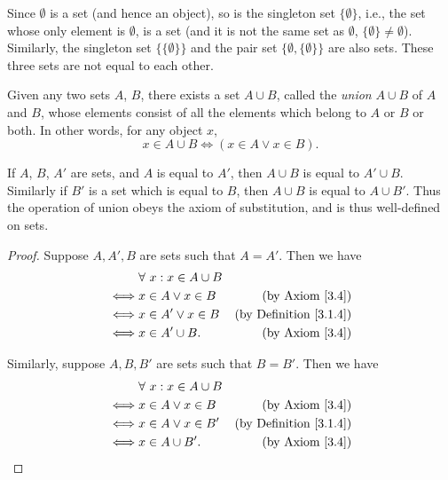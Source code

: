 \begin{example}\label{3.1.10}
Since \(\emptyset\) is a set (and hence an object), so is the singleton set \(\{\emptyset\}\), i.e., the set whose only element is \(\emptyset\), is a set (and it is not the same set as \(\emptyset\), \(\{\emptyset\} \neq \emptyset\)).
Similarly, the singleton set \(\{\{\emptyset\}\}\) and the pair set \(\{\emptyset, \{\emptyset\}\}\) are also sets.
These three sets are not equal to each other.
\end{example}

\begin{axiom}\label{3.4}
Given any two sets \(A\), \(B\), there exists a set \(A \cup B\), called the \emph{union} \(A \cup B\) of \(A\) and \(B\), whose elements consist of all the elements which belong to \(A\) or \(B\) or both.
In other words, for any object \(x\),
\[
    x \in A \cup B \iff (x \in A \lor x \in B).
\]
\end{axiom}

\setcounter{theorem}{11}
\begin{remark}\label{3.1.12}
If \(A\), \(B\), \(A'\) are sets, and \(A\) is equal to \(A'\), then \(A \cup B\) is equal to \(A' \cup B\).
Similarly if \(B'\) is a set which is equal to \(B\), then \(A \cup B\) is equal to \(A \cup B'\).
Thus the operation of union obeys the axiom of substitution, and is thus well-defined on sets.
\end{remark}

\begin{proof}
Suppose \(A, A', B\) are sets such that \(A = A'\).
Then we have
\begin{align*}
& \forall\ x : x \in A \cup B \\
\iff & x \in A \lor x \in B & \text{(by Axiom \ref{3.4})} \\
\iff & x \in A' \lor x \in B & \text{(by Definition \ref{3.1.4})} \\
\iff & x \in A' \cup B. & \text{(by Axiom \ref{3.4})}
\end{align*}

Similarly, suppose \(A, B, B'\) are sets such that \(B = B'\).
Then we have
\begin{align*}
& \forall\ x : x \in A \cup B \\
\iff & x \in A \lor x \in B & \text{(by Axiom \ref{3.4})} \\
\iff & x \in A \lor x \in B' & \text{(by Definition \ref{3.1.4})} \\
\iff & x \in A \cup B'. & \text{(by Axiom \ref{3.4})}
\end{align*}
\end{proof}


